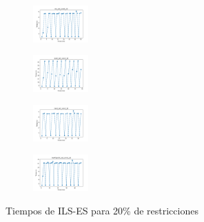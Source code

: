 \begin{figure}[H]
\begin{subfigure}
    \end{subfigure}
    \hfill
    \begin{subfigure}
        \centering
        \includegraphics[width=0.234\textwidth]{img/ils-es/iris_set_const_20_3773969821_time.png}
    \end{subfigure}
    \hfill
    \begin{subfigure}
        \centering
        \includegraphics[width=0.234\textwidth]{img/ils-es/ecoli_set_const_20_3773969821_time.png}
    \end{subfigure}
    \hfill
    \begin{subfigure}
        \centering
        \includegraphics[width=0.234\textwidth]{img/ils-es/rand_set_const_20_3773969821_time.png}
    \end{subfigure}
    \hfill
    \begin{subfigure}
        \centering
        \includegraphics[width=0.234\textwidth]{img/ils-es/newthyroid_set_const_20_3773969821_time.png}
    \end{subfigure}
    \caption{Tiempos de ILS-ES para 20\% de restricciones}
\end{figure}

\vspace*{\fill}
\newpage
\vspace*{\fill}

